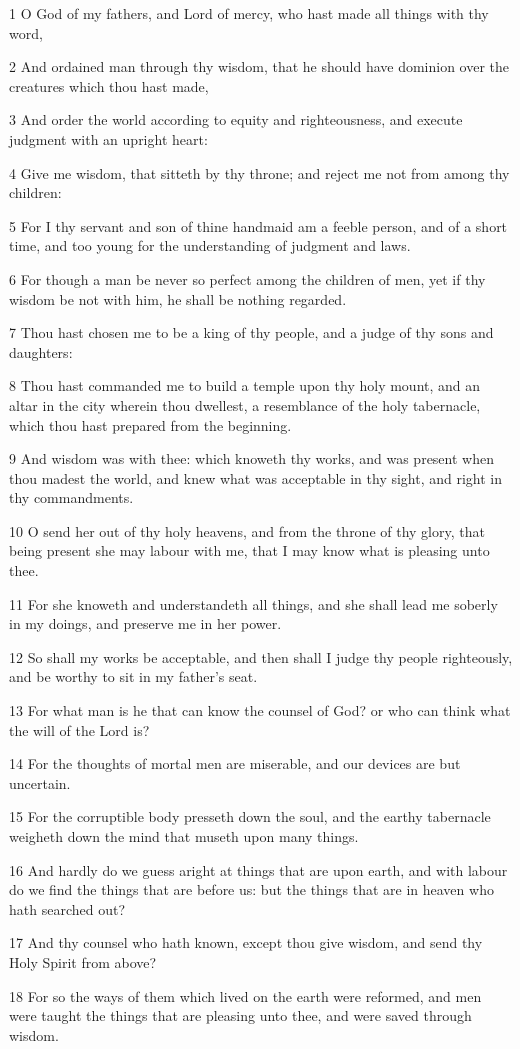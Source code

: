 \par 1 O God of my fathers, and Lord of mercy, who hast made all things with thy word,
\par 2 And ordained man through thy wisdom, that he should have dominion over the creatures which thou hast made,
\par 3 And order the world according to equity and righteousness, and execute judgment with an upright heart:
\par 4 Give me wisdom, that sitteth by thy throne; and reject me not from among thy children:
\par 5 For I thy servant and son of thine handmaid am a feeble person, and of a short time, and too young for the understanding of judgment and laws.
\par 6 For though a man be never so perfect among the children of men, yet if thy wisdom be not with him, he shall be nothing regarded.
\par 7 Thou hast chosen me to be a king of thy people, and a judge of thy sons and daughters:
\par 8 Thou hast commanded me to build a temple upon thy holy mount, and an altar in the city wherein thou dwellest, a resemblance of the holy tabernacle, which thou hast prepared from the beginning.
\par 9 And wisdom was with thee: which knoweth thy works, and was present when thou madest the world, and knew what was acceptable in thy sight, and right in thy commandments.
\par 10 O send her out of thy holy heavens, and from the throne of thy glory, that being present she may labour with me, that I may know what is pleasing unto thee.
\par 11 For she knoweth and understandeth all things, and she shall lead me soberly in my doings, and preserve me in her power.
\par 12 So shall my works be acceptable, and then shall I judge thy people righteously, and be worthy to sit in my father's seat.
\par 13 For what man is he that can know the counsel of God? or who can think what the will of the Lord is?
\par 14 For the thoughts of mortal men are miserable, and our devices are but uncertain.
\par 15 For the corruptible body presseth down the soul, and the earthy tabernacle weigheth down the mind that museth upon many things.
\par 16 And hardly do we guess aright at things that are upon earth, and with labour do we find the things that are before us: but the things that are in heaven who hath searched out?
\par 17 And thy counsel who hath known, except thou give wisdom, and send thy Holy Spirit from above?
\par 18 For so the ways of them which lived on the earth were reformed, and men were taught the things that are pleasing unto thee, and were saved through wisdom.

